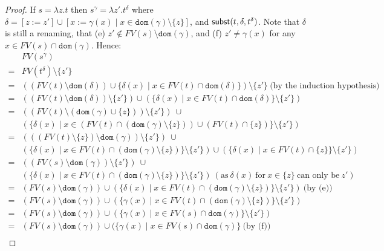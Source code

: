 \documentclass{lmcs}
\theoremstyle{theorem}\newtheorem{theorem}[dummy]{Theorem}
\theoremstyle{theorem}\newtheorem{lemma}[dummy]{Lemma}
\theoremstyle{theorem}\newtheorem{corollary}[dummy]{Corollary}
\theoremstyle{definition}\newtheorem{definition}[dummy]{Definition}
\theoremstyle{definition}\newtheorem{example}[dummy]{Example}
\newcommand{\FV}{\mathit{FV}}
\newcommand{\domain}{\mathtt{dom}}
\newcommand{\abs}[2]{\lambda #1.#2}
\begin{document}
\begin{proof}
If $s = \abs{z}{t}$ then $s^\gamma = \abs{z'}{t^\delta}$ where $\delta = [z:=z'] \cup [x:=
\gamma(x) \mid x \in \domain(\gamma) \setminus \{z\}]$, and $\mathsf{subst}(t,\delta,t^\delta)$.  Note
that $\delta$ is still a renaming, that (e) $z' \notin \FV(s) \setminus \domain(\gamma)$, and
(f) $z' \neq \gamma(x)$ for any $x \in \FV(s) \cap \domain(\gamma)$.
Hence:
\[
\begin{array}{cl}
& \FV(s^\gamma) \\
= & \FV(t^\delta) \setminus \{ z' \} \\
= & ((\FV(t) \setminus \domain(\delta)) \cup \{ \delta(x) \mid x \in \FV(t) \cap \domain(\delta) \}) \setminus \{z'\}\ 
  \text{(by the induction hypothesis)} \\
= & ((\FV(t) \setminus \domain(\delta)) \setminus \{z'\}) \cup
  (\{ \delta(x) \mid x \in \FV(t) \cap \domain(\delta) \} \setminus \{z'\}) \\
= & ((\FV(t) \setminus (\domain(\gamma) \cup \{z\})) \setminus \{z'\})\ \cup \\ &
  (\{ \delta(x) \mid x \in (\FV(t) \cap (\domain(\gamma) \setminus \{z\})) \cup (\FV(t) \cap \{z\}) \} \setminus \{z'\}) \\
= & (((\FV(t) \setminus \{z\}) \setminus \domain(\gamma)) \setminus \{z'\})\ \cup \\ &
  (\{ \delta(x) \mid x \in \FV(t) \cap (\domain(\gamma) \setminus \{z\}) \} \setminus \{z'\}) \cup
  (\{ \delta(x) \mid x \in \FV(t) \cap \{z\} \} \setminus \{z'\}) \\
= & ((\FV(s) \setminus \domain(\gamma)) \setminus \{z'\})\ \cup \\ &
  (\{ \delta(x) \mid x \in \FV(t) \cap (\domain(\gamma) \setminus \{z\}) \} \setminus \{z'\})\ 
  (\text{as}\ \delta(x)\ \text{for}\ x \in \{z\}\ \text{can only be}\ z') \\
= & (\FV(s) \setminus \domain(\gamma)) \cup
  (\{ \delta(x) \mid x \in \FV(t) \cap (\domain(\gamma) \setminus \{z\}) \} \setminus \{z'\})\ 
  \text{(by (e))} \\
= & (\FV(s) \setminus \domain(\gamma)) \cup
  (\{ \gamma(x) \mid x \in \FV(t) \cap (\domain(\gamma) \setminus \{z\}) \} \setminus \{z'\}) \\
= & (\FV(s) \setminus \domain(\gamma)) \cup
  (\{ \gamma(x) \mid x \in \FV(s) \cap \domain(\gamma) \} \setminus \{z'\}) \\
= & (\FV(s) \setminus \domain(\gamma)) \cup
  (\{ \gamma(x) \mid x \in \FV(s) \cap \domain(\gamma) \}\ \text{(by (f))} \\
\end{array}
\]
\end{proof}
\end{document}
